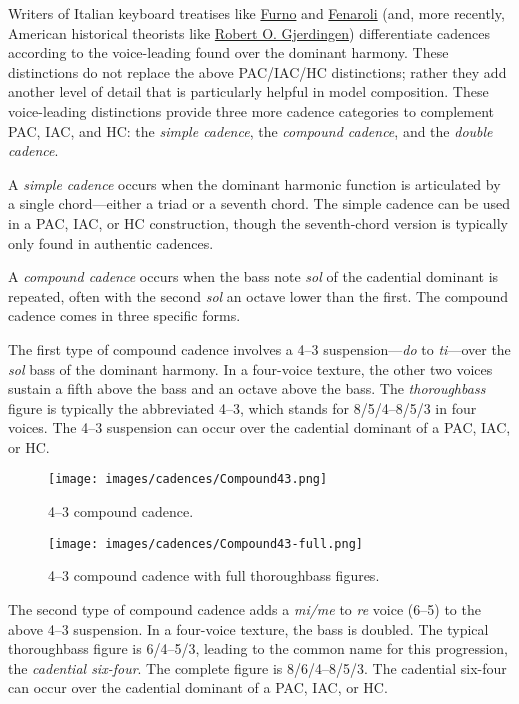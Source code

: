 \documentclass{book}
\begin{document}
Writers of Italian keyboard treatises like
\href{http://faculty-web.at.northwestern.edu/music/gjerdingen/partimenti/collections/Furno/regoleP5.htm}{Furno}
and
\href{http://faculty-web.at.northwestern.edu/music/gjerdingen/partimenti/collections/Fenaroli/Regole/regoleP3.htm}{Fenaroli}
(and, more recently, American historical theorists like
\href{http://faculty-web.at.northwestern.edu/music/gjerdingen/index.htm}{Robert
O. Gjerdingen}) differentiate cadences according to the voice-leading found
over the dominant harmony. These distinctions do not replace the above
PAC/IAC/HC distinctions; rather they add another level of detail that is
particularly helpful in model composition. These voice-leading distinctions
provide three more cadence categories to complement PAC, IAC, and HC: the
\emph{simple cadence}, the \emph{compound cadence}, and the \emph{double
cadence}.

A \emph{simple cadence} occurs when the dominant harmonic function is
articulated by a single chord---either a triad or a seventh chord. The simple
cadence can be used in a PAC, IAC, or HC construction, though the
seventh-chord version is typically only found in authentic cadences.

A \emph{compound cadence} occurs when the bass note \emph{sol} of the
cadential dominant is repeated, often with the second \emph{sol} an octave
lower than the first. The compound cadence comes in three specific forms.

The first type of compound cadence involves a 4--3 suspension---\emph{do} to
\emph{ti}---over the \emph{sol} bass of the dominant harmony. In a four-voice
texture, the other two voices sustain a fifth above the bass and an octave
above the bass. The \emph{thoroughbass} figure is typically the abbreviated
4--3, which stands for 8/5/4--8/5/3 in four voices. The 4--3 suspension can
occur over the cadential dominant of a PAC, IAC, or HC.

\begin{figure}
\centering
\texttt{[image: images/cadences/Compound43.png]}
\caption{4--3 compound cadence.}
\end{figure}

\begin{figure}
\centering
\texttt{[image: images/cadences/Compound43-full.png]}
\caption{4--3 compound cadence with full thoroughbass figures.}
\end{figure}

The second type of compound cadence adds a \emph{mi/me} to \emph{re} voice
(6--5) to the above 4--3 suspension. In a four-voice texture, the bass is
doubled. The typical thoroughbass figure is 6/4--5/3, leading to the common
name for this progression, the \emph{cadential six-four}. The complete figure
is 8/6/4--8/5/3. The cadential six-four can occur over the cadential dominant
of a PAC, IAC, or HC.
\end{document}
